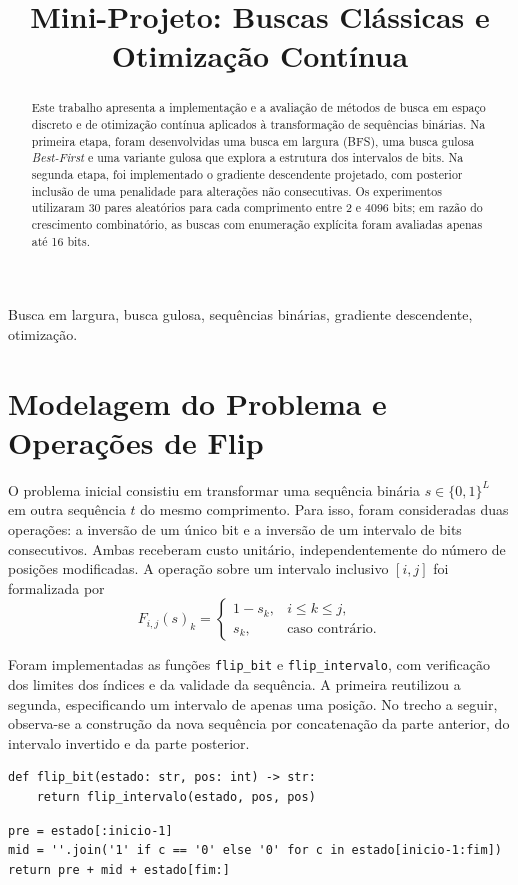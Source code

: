 \documentclass[conference,a4paper]{IEEEtran}
\title{Mini-Projeto: Buscas Clássicas e Otimização Contínua}
\author{\IEEEauthorblockN{Luan Diniz Mazaro Rodovalho}
\IEEEauthorblockA{Universidade Federal de Uberlândia (UFU)\\Brasil}}
\begin{document}
\maketitle

\begin{abstract}
Este trabalho apresenta a implementação e a avaliação de métodos de busca em espaço discreto e de otimização contínua aplicados à transformação de sequências binárias. Na primeira etapa, foram desenvolvidas uma busca em largura (BFS), uma busca gulosa \textit{Best-First} e uma variante gulosa que explora a estrutura dos intervalos de bits. Na segunda etapa, foi implementado o gradiente descendente projetado, com posterior inclusão de uma penalidade para alterações não consecutivas. Os experimentos utilizaram 30 pares aleatórios para cada comprimento entre 2 e 4096 bits; em razão do crescimento combinatório, as buscas com enumeração explícita foram avaliadas apenas até 16 bits.
\end{abstract}
\begin{IEEEkeywords}
Busca em largura, busca gulosa, sequências binárias, gradiente descendente, otimização.
\end{IEEEkeywords}

\section{Modelagem do Problema e Operações de Flip}
O problema inicial consistiu em transformar uma sequência binária $s\in\{0,1\}^L$ em outra sequência $t$ do mesmo comprimento. Para isso, foram consideradas duas operações: a inversão de um único bit e a inversão de um intervalo de bits consecutivos. Ambas receberam custo unitário, independentemente do número de posições modificadas. A operação sobre um intervalo inclusivo $[i,j]$ foi formalizada por
\begin{equation}
F_{i,j}(s)_k=\begin{cases}1-s_k,&i\leq k\leq j,\\s_k,&\text{caso contrário.}\end{cases}
\end{equation}

Foram implementadas as funções \texttt{flip\_bit} e \texttt{flip\_intervalo}, com verificação dos limites dos índices e da validade da sequência. A primeira reutilizou a segunda, especificando um intervalo de apenas uma posição. No trecho a seguir, observa-se a construção da nova sequência por concatenação da parte anterior, do intervalo invertido e da parte posterior.
\begin{lstlisting}
def flip_bit(estado: str, pos: int) -> str:
    return flip_intervalo(estado, pos, pos)
\end{lstlisting}
\begin{lstlisting}
pre = estado[:inicio-1]
mid = ''.join('1' if c == '0' else '0' for c in estado[inicio-1:fim])
return pre + mid + estado[fim:]
\end{lstlisting}
\end{document}
